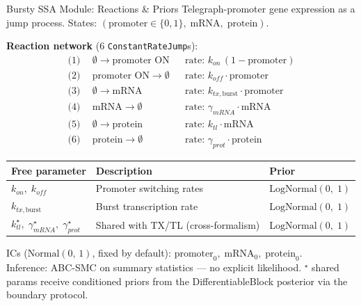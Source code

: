 \documentclass[aspectratio=169]{beamer}
\begin{document}
\begin{frame}[noframenumbering]{Bursty SSA Module: Reactions \& Priors}
	\footnotesize
	Telegraph-promoter gene expression as a jump process. States: $(\text{promoter}\in\{0,1\},\; \text{mRNA},\; \text{protein})$.

	\medskip
	\textbf{Reaction network} (6 \texttt{ConstantRateJump}s):
	\begin{align*}
		\text{(1)}\;\, &\emptyset \to \text{promoter ON} & &\text{rate: } k_{on}\,(1 - \text{promoter}) \\
		\text{(2)}\;\, &\text{promoter ON} \to \emptyset & &\text{rate: } k_{off}\cdot\text{promoter} \\
		\text{(3)}\;\, &\emptyset \to \text{mRNA} & &\text{rate: } k_{tx,\text{burst}}\cdot\text{promoter} \\
		\text{(4)}\;\, &\text{mRNA} \to \emptyset & &\text{rate: } \gamma_{mRNA}\cdot\text{mRNA} \\
		\text{(5)}\;\, &\emptyset \to \text{protein} & &\text{rate: } k_{tl}\cdot\text{mRNA} \\
		\text{(6)}\;\, &\text{protein} \to \emptyset & &\text{rate: } \gamma_{prot}\cdot\text{protein}
	\end{align*}

	\medskip
	\begin{tabular}{lll}
		\toprule
		\textbf{Free parameter} & \textbf{Description} & \textbf{Prior} \\
		\midrule
		$k_{on},\; k_{off}$ & Promoter switching rates & $\text{LogNormal}(0,\;1)$ \\
		$k_{tx,\text{burst}}$ & Burst transcription rate & $\text{LogNormal}(0,\;1)$ \\
		$k_{tl}^\star,\; \gamma_{mRNA}^\star,\; \gamma_{prot}^\star$ & Shared with TX/TL (cross-formalism) & $\text{LogNormal}(0,\;1)$ \\
		\bottomrule
	\end{tabular}

	\smallskip
	{\scriptsize ICs ($\text{Normal}(0,\,1)$, fixed by default): $\text{promoter}_0,\;\text{mRNA}_0,\;\text{protein}_0$.\\
	Inference: ABC-SMC on summary statistics --- no explicit likelihood. $^\star$ shared params receive conditioned priors from the DifferentiableBlock posterior via the boundary protocol.}
\end{frame}


\end{document}
